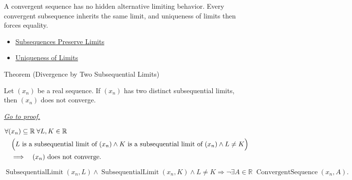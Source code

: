 \begin{remark*}[Interpretation]
A convergent sequence has no hidden alternative limiting behavior. Every
convergent subsequence inherits the same limit, and uniqueness of limits then
forces equality.
\end{remark*}

\begin{dependencies}
\begin{itemize}
  \item \hyperref[thm:subsequences-preserve-limits]{Subsequences Preserve Limits}
  \item \hyperref[thm:uniqueness-of-limits]{Uniqueness of Limits}
\end{itemize}
\end{dependencies}


\begin{theorembox}{Theorem (Divergence by Two Subsequential Limits)}
\begin{theorem}
\label{thm:divergence-by-two-subsequential-limits}
Let $(x_n)$ be a real sequence. If $(x_n)$ has two distinct subsequential
limits, then $(x_n)$ does not converge.

\smallskip
\noindent
\hyperref[prf:divergence-by-two-subsequential-limits]{\textit{Go to proof.}}
\end{theorem}
\end{theorembox}

\begin{remark*}
\[
\begin{aligned}
&\forall (x_n)\subseteq\mathbb{R}\;\forall L,K\in\mathbb{R}\\
&\quad\Bigl(
  L\text{ is a subsequential limit of }(x_n)
  \land
  K\text{ is a subsequential limit of }(x_n)
  \land
  L\neq K
\Bigr)\\
&\quad\Longrightarrow\quad
\text{$(x_n)$ does not converge}.
\end{aligned}
\]
\end{remark*}

\begin{remark*}
\[
\operatorname{SubsequentialLimit}(x_n,L)
\land
\operatorname{SubsequentialLimit}(x_n,K)
\land
L\neq K
\Longrightarrow
\neg\exists A\in\mathbb{R}\;\operatorname{ConvergentSequence}(x_n,A).
\]
\end{remark*}

